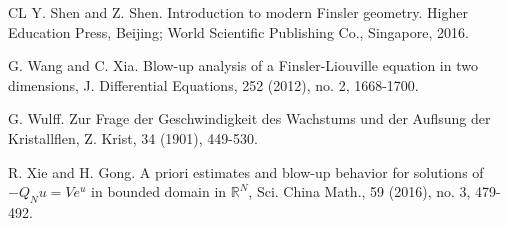 \documentclass[11pt]{amsart}
\numberwithin{equation}{section}
\begin{document}
\begin{thebibliography}{CL}
 Y. Shen and Z. Shen. Introduction to modern Finsler geometry. Higher Education Press, Beijing; World Scientific Publishing Co., Singapore, 2016.


 G. Wang and C. Xia. Blow-up analysis of a Finsler-Liouville equation in two dimensions, J. Differential Equations, 252 (2012), no. 2, 1668-1700.

 G. Wulff. Zur Frage der Geschwindigkeit des Wachstums und der Auflsung der Kristallflen, Z. Krist, 34 (1901), 449-530.

 R. Xie and H. Gong. A priori estimates and blow-up behavior for solutions of $-Q_{N}u=Ve^{u}$ in bounded domain in $\mathbb{R}^N$, Sci. China Math., 59 (2016), no. 3, 479-492.

\end{thebibliography}
\end{document}
